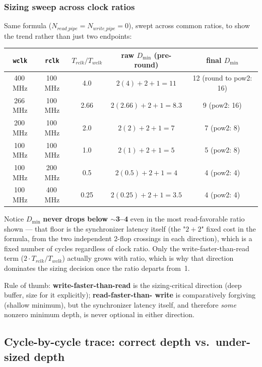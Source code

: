 \documentclass[12pt]{article}
\begin{document}
\subsubsection{Sizing sweep across clock ratios}

Same formula ($N_{read\_pipe}=N_{write\_pipe}=0$), swept across common
ratios, to show the trend rather than just two endpoints:

\begin{center}
\renewcommand{\arraystretch}{1.2}
\begin{tabular}{ccccc}
\toprule
\texttt{wclk} & \texttt{rclk} & $T_{rclk}/T_{wclk}$ & raw $D_{\min}$ (pre-round) & final $D_{\min}$ \\
\midrule
400\,MHz & 100\,MHz & 4.0 & $2(4)+2+1=11$ & 12 (round to pow2: 16) \\
266\,MHz & 100\,MHz & 2.66 & $2(2.66)+2+1=8.3$ & 9 (pow2: 16) \\
200\,MHz & 100\,MHz & 2.0 & $2(2)+2+1=7$ & 7 (pow2: 8) \\
100\,MHz & 100\,MHz & 1.0 & $2(1)+2+1=5$ & 5 (pow2: 8) \\
100\,MHz & 200\,MHz & 0.5 & $2(0.5)+2+1=4$ & 4 (pow2: 4) \\
100\,MHz & 400\,MHz & 0.25 & $2(0.25)+2+1=3.5$ & 4 (pow2: 4) \\
\bottomrule
\end{tabular}
\end{center}

Notice $D_{\min}$ \textbf{never drops below $\sim$3--4} even in the most
read-favorable ratio shown — that floor is the synchronizer latency itself
(the "$2+2$" fixed cost in the formula, from the two independent 2-flop
crossings in each direction), which is a fixed number of cycles regardless
of clock ratio. Only the write-faster-than-read term
($2 \cdot T_{rclk}/T_{wclk}$) actually grows with ratio, which is why that
direction dominates the sizing decision once the ratio departs from~1.

\begin{keybox}
Rule of thumb: \textbf{write-faster-than-read} is the sizing-critical
direction (deep buffer, size for it explicitly); \textbf{read-faster-than-
write} is comparatively forgiving (shallow minimum), but the synchronizer
latency itself, and therefore \emph{some} nonzero minimum depth, is never
optional in either direction.
\end{keybox}

\subsection{Cycle-by-cycle trace: correct depth vs.\ under-sized depth}
\label{sec:trace}
\end{document}
